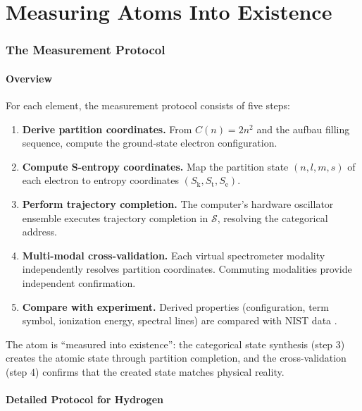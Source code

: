 \documentclass[11pt,a4paper]{article}
\theoremstyle{definition}
\theoremstyle{remark}
\newcommand{\Sk}{S_{\mathrm{k}}}
\newcommand{\St}{S_{\mathrm{t}}}
\newcommand{\Se}{S_{\mathrm{e}}}
\newcommand{\Sspace}{\mathcal{S}}
\begin{document}
\part{Measuring Atoms Into Existence}

\section{The Measurement Protocol}
\label{sec:measurement_protocol}

\subsection{Overview}

For each element, the measurement protocol consists of five steps:

\begin{enumerate}
\item \textbf{Derive partition coordinates.} From $C(n) = 2n^2$ and the aufbau filling sequence, compute the ground-state electron configuration.
\item \textbf{Compute S-entropy coordinates.} Map the partition state $(n, l, m, s)$ of each electron to entropy coordinates $(\Sk, \St, \Se)$.
\item \textbf{Perform trajectory completion.} The computer's hardware oscillator ensemble executes trajectory completion in $\Sspace$, resolving the categorical address.
\item \textbf{Multi-modal cross-validation.} Each virtual spectrometer modality independently resolves partition coordinates. Commuting modalities provide independent confirmation.
\item \textbf{Compare with experiment.} Derived properties (configuration, term symbol, ionization energy, spectral lines) are compared with NIST data \citep{nist_asd}.
\end{enumerate}

The atom is ``measured into existence'': the categorical state synthesis (step 3) creates the atomic state through partition completion, and the cross-validation (step 4) confirms that the created state matches physical reality.

\subsection{Detailed Protocol for Hydrogen}
\end{document}
